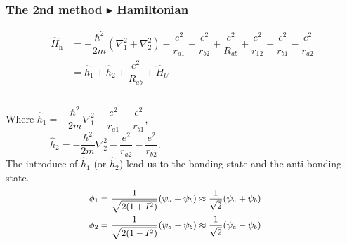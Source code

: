 \documentclass{beamer}
\begin{document}
  \begin{frame}
    \frametitle{The 2nd method \(\blacktriangleright\) Hamiltonian}
    \begin{equation*}
      \begin{aligned}
        \widehat{H}_{\text{h}} &= -\dfrac{\hbar^2}{2m}\left(\nabla_1^2 + \nabla_2^2\right) - \dfrac{e^2}{r_{a1}} - \dfrac{e^2}{r_{b2}} + \dfrac{e^2}{R_{ab}} + \dfrac{e^2}{r_{12}} - \dfrac{e^2}{r_{b1}} - \dfrac{e^2}{r_{a2}}\\
        &= \widehat{h}_{1} + \widehat{h}_{2} + \dfrac{e^2}{R_{ab}} + \widehat{H}_U 
      \end{aligned}
    \end{equation*}
    \begin{columns}
      \begin{column}{0.7\textwidth}
        Where {\small \(\widehat{h}_{1} = -\dfrac{\hbar^2}{2m}\nabla_1^2 - \dfrac{e^2}{r_{a1}} - \dfrac{e^2}{r_{b1}}\), \\
        \ \ \ \ \ \ \ \ \ \(\widehat{h}_{2} = -\dfrac{\hbar^2}{2m}\nabla_2^2 - \dfrac{e^2}{r_{a2}} - \dfrac{e^2}{r_{b2}}\)}.\\[0.5em]
        The introduce of \(\widehat{h}_{1}\) (or \(\widehat{h}_{2}\)) lead us to the bonding state and the anti-bonding state.
        \begin{subequations}\small
          \begin{align}
            \phi_1 &= \dfrac{1}{\sqrt{2(1+I^2)}}(\psi_a+\psi_b) \approx \dfrac{1}{\sqrt{2}}(\psi_a+\psi_b)\\
            \phi_2 &= \dfrac{1}{\sqrt{2(1-I^2)}}(\psi_a-\psi_b) \approx \dfrac{1}{\sqrt{2}}(\psi_a-\psi_b)
          \end{align}
        \end{subequations}
      \end{column}
      \begin{column}{0.25\textwidth}
      \end{column}
    \end{columns}
    
  \end{frame}
\end{document}
